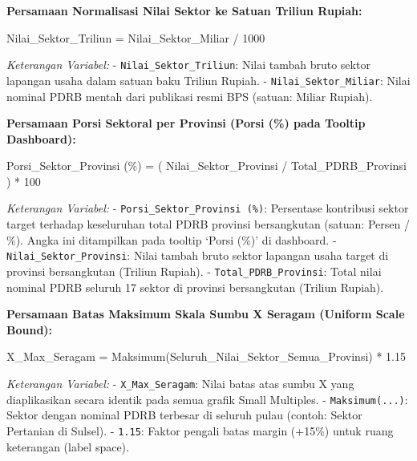 \documentclass[
]{article}
\newenvironment{Shaded}{}{}
\newcommand{\NormalTok}[1]{#1}
\begin{document}
\textbf{Persamaan Normalisasi Nilai Sektor ke Satuan Triliun Rupiah:}

\begin{Shaded}
\begin{Highlighting}[]
\NormalTok{Nilai\_Sektor\_Triliun = Nilai\_Sektor\_Miliar / 1000}
\end{Highlighting}
\end{Shaded}

\emph{Keterangan Variabel:} - \texttt{Nilai\_Sektor\_Triliun}: Nilai
tambah bruto sektor lapangan usaha dalam satuan baku Triliun Rupiah. -
\texttt{Nilai\_Sektor\_Miliar}: Nilai nominal PDRB mentah dari publikasi
resmi BPS (satuan: Miliar Rupiah).

\textbf{Persamaan Porsi Sektoral per Provinsi (Porsi (\%) pada Tooltip
Dashboard):}

\begin{Shaded}
\begin{Highlighting}[]
\NormalTok{Porsi\_Sektor\_Provinsi (\%) = ( Nilai\_Sektor\_Provinsi / Total\_PDRB\_Provinsi ) * 100}
\end{Highlighting}
\end{Shaded}

\emph{Keterangan Variabel:} - \texttt{Porsi\_Sektor\_Provinsi\ (\%)}:
Persentase kontribusi sektor target terhadap keseluruhan total PDRB
provinsi bersangkutan (satuan: Persen / \%). Angka ini ditampilkan pada
tooltip `Porsi (\%)' di dashboard. - \texttt{Nilai\_Sektor\_Provinsi}:
Nilai tambah bruto sektor lapangan usaha target di provinsi bersangkutan
(Triliun Rupiah). - \texttt{Total\_PDRB\_Provinsi}: Total nilai nominal
PDRB seluruh 17 sektor di provinsi bersangkutan (Triliun Rupiah).

\textbf{Persamaan Batas Maksimum Skala Sumbu X Seragam (Uniform Scale
Bound):}

\begin{Shaded}
\begin{Highlighting}[]
\NormalTok{X\_Max\_Seragam = Maksimum(Seluruh\_Nilai\_Sektor\_Semua\_Provinsi) * 1.15}
\end{Highlighting}
\end{Shaded}

\emph{Keterangan Variabel:} - \texttt{X\_Max\_Seragam}: Nilai batas atas
sumbu X yang diaplikasikan secara identik pada semua grafik Small
Multiples. - \texttt{Maksimum(...)}: Sektor dengan nominal PDRB terbesar
di seluruh pulau (contoh: Sektor Pertanian di Sulsel). - \texttt{1.15}:
Faktor pengali batas margin (+15\%) untuk ruang keterangan (label
space).
\end{document}
